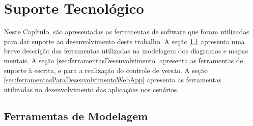 \chapter{Suporte Tecnológico}
\label{chap:suporteTecnologico}

Neste Capítulo, são apresentadas as ferramentas de software que foram utilizadas para dar suporte ao desenvolvimento deste trabalho. A seção \ref{sec:ferramentasModelagem} apresenta uma breve descrição das ferramentas utilizadas na modelagem dos diagramas e mapas mentais. A seção \ref{sec:ferramentasDesenvolvimento} apresenta as ferramentas de suporte à escrita, e para a realização do controle de versão. A seção \ref{sec:ferramentasParaDesenvolvimentoWebApp} apresenta as ferramentas utilizadas no desenvolvimento das aplicações nos cenários.   

\section{Ferramentas de Modelagem}
\label{sec:ferramentasModelagem}

